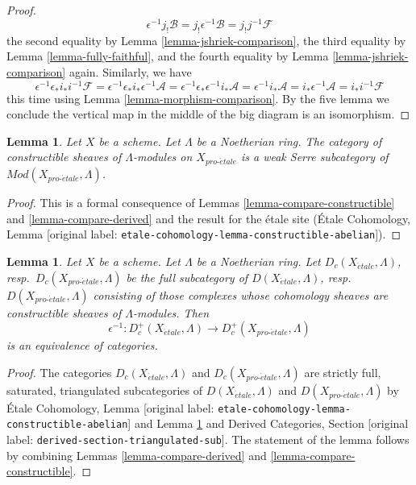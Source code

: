 \documentclass[10pt,a4paper]{article}
\theoremstyle{plain}
\newtheorem{lemma}[subsection]{Lemma}
\theoremstyle{definition}
\theoremstyle{remark}
\numberwithin{equation}{subsection}
\def\proetale{{pro\text{-}\acute{e}tale}}
\def\etale{{\acute{e}tale}}
\begin{document}
\begin{proof}
$$\epsilon^{-1}j_!\mathcal{B} =
j_!\epsilon^{-1}\mathcal{B} =
j_!j^{-1}\mathcal{F}
$$
the second equality by Lemma \ref{lemma-jshriek-comparison},
the third equality by Lemma \ref{lemma-fully-faithful}, and the
fourth equality by Lemma \ref{lemma-jshriek-comparison} again.
Similarly, we have
$$
\epsilon^{-1}\epsilon_*i_*i^{-1}\mathcal{F} =
\epsilon^{-1}\epsilon_*i_*\epsilon^{-1}\mathcal{A} =
\epsilon^{-1}\epsilon_*\epsilon^{-1}i_*\mathcal{A} =
\epsilon^{-1}i_*\mathcal{A} =
i_*\epsilon^{-1}\mathcal{A} =
i_*i^{-1}\mathcal{F}
$$
this time using Lemma \ref{lemma-morphism-comparison}.
By the five lemma we conclude the
vertical map in the middle of the big diagram is an isomorphism.
\end{proof}

\begin{lemma}
\label{lemma-constructible-serre}
Let $X$ be a scheme. Let $\Lambda$ be a Noetherian ring.
The category of constructible sheaves of $\Lambda$-modules on $X_\proetale$
is a weak Serre subcategory of $\textit{Mod}(X_\proetale, \Lambda)$.
\end{lemma}

\begin{proof}
This is a formal consequence of
Lemmas \ref{lemma-compare-constructible} and \ref{lemma-compare-derived}
and the result for the \'etale site
(\'Etale Cohomology, Lemma [original label: \nolinkurl{etale-cohomology-lemma-constructible-abelian}]).
\end{proof}

\begin{lemma}
\label{lemma-compare-constructible-derived}
Let $X$ be a scheme. Let $\Lambda$ be a Noetherian ring.
Let $D_c(X_\etale, \Lambda)$, resp.\ $D_c(X_\proetale, \Lambda)$
be the full subcategory of
$D(X_\etale, \Lambda)$, resp.\ $D(X_\proetale, \Lambda)$
consisting of those complexes whose cohomology sheaves are
constructible sheaves of $\Lambda$-modules. Then
$$
\epsilon^{-1} :
D_c^+(X_\etale, \Lambda)
\longrightarrow
D_c^+(X_\proetale, \Lambda)
$$
is an equivalence of categories.
\end{lemma}

\begin{proof}
The categories $D_c(X_\etale, \Lambda)$ and $D_c(X_\proetale, \Lambda)$
are strictly full, saturated, triangulated subcategories of
$D(X_\etale, \Lambda)$ and $D(X_\proetale, \Lambda)$ by
\'Etale Cohomology, Lemma [original label: \nolinkurl{etale-cohomology-lemma-constructible-abelian}]
and
Lemma \ref{lemma-constructible-serre}
and
Derived Categories, Section [original label: \nolinkurl{derived-section-triangulated-sub}].
The statement of the lemma follows by combining
Lemmas \ref{lemma-compare-derived} and
\ref{lemma-compare-constructible}.
\end{proof}
\end{document}
